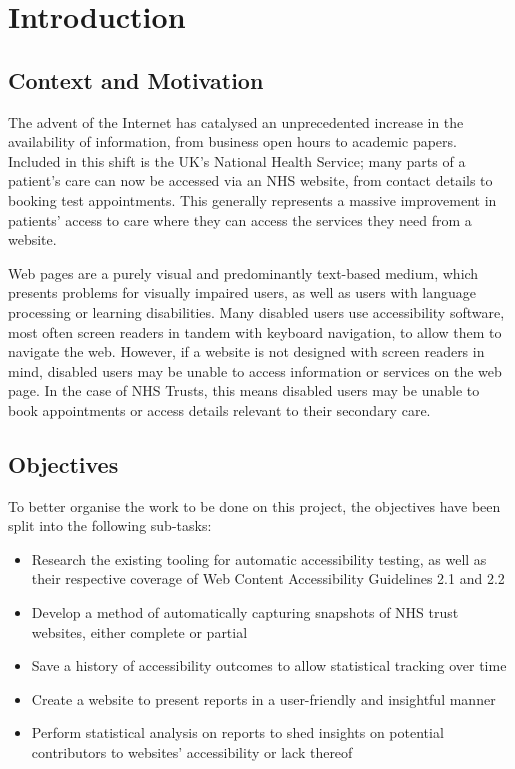 \chapter{Introduction}\label{cha:intro}


\section{Context and Motivation}
The advent of the Internet has catalysed an unprecedented increase in the availability of information, from business open hours to academic papers. Included in this shift is the UK's National Health Service; many parts of a patient's care can now be accessed via an NHS website, from contact details to booking test appointments. This generally represents a massive improvement in patients' access to care where they can access the services they need from a website.

Web pages are a purely visual and predominantly text-based medium, which presents problems for visually impaired users, as well as users with language processing or learning disabilities. Many disabled users use accessibility software, most often screen readers in tandem with keyboard navigation, to allow them to navigate the web. However, if a website is not designed with screen readers in mind, disabled users may be unable to access information or services on the web page. In the case of NHS Trusts, this means disabled users may be unable to book appointments or access details relevant to their secondary care.

\section{Objectives}\label{sec:objectives}
To better organise the work to be done on this project, the objectives have been split into the following sub-tasks:
\begin{itemize}
    \item Research the existing tooling for automatic accessibility testing, as well as their respective coverage of Web Content Accessibility Guidelines 2.1 and 2.2
    \item Develop a method of automatically capturing snapshots of NHS trust websites, either complete or partial
    \item Save a history of accessibility outcomes to allow statistical tracking over time
    \item Create a website to present reports in a user-friendly and insightful manner
    \item Perform statistical analysis on reports to shed insights on potential contributors to websites' accessibility or lack thereof
\end{itemize}

